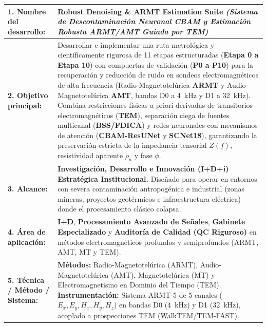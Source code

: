\documentclass[11pt,letterpaper]{article}
\begin{document}
\begin{tcolorbox}[
    colback=white,
    colframe=geotemBlue,
    arc=2mm,
    boxrule=1pt,
    title=\textbf{\large 10 Puntos de Caracterización Institucional},
    coltitle=white,
    colbacktitle=geotemBlue,
    left=10pt, right=10pt, top=10pt, bottom=10pt
]

\renewcommand{\arraystretch}{1.36}
\begin{tabularx}{\textwidth}{@{} p{4.6cm} X @{}}
    \textbf{1. Nombre del desarrollo:} & 
    \textbf{Robust Denoising \& ARMT Estimation Suite} \newline
    \textit{(Sistema de Descontaminación Neuronal CBAM y Estimación Robusta ARMT/AMT Guiada por TEM)} \\
    \hline

    \textbf{2. Objetivo principal:} & 
    Desarrollar e implementar una ruta metrológica y científicamente rigurosa de 11 etapas estructuradas (\textbf{Etapa 0 a Etapa 10}) con compuertas de validación (\textbf{P0 a P10}) para la recuperación y reducción de ruido en sondeos electromagnéticos de alta frecuencia (Radio-Magnetotelúrica \textbf{ARMT} y Audio-Magnetotelúrica \textbf{AMT}, bandas D0 a 4~kHz y D1 a 32~kHz). Combina restricciones físicas a priori derivadas de transitorios electromagnéticos (\textbf{TEM}), separación ciega de fuentes multicanal (\textbf{BSS/FDICA}) y redes neuronales con mecanismos de atención (\textbf{CBAM-ResUNet} y \textbf{SCNet18}), garantizando la preservación estricta de la impedancia tensorial $Z(f)$, resistividad aparente $\rho_a$ y fase $\phi$. \\
    \hline

    \textbf{3. Alcance:} & 
    \textbf{Investigación, Desarrollo e Innovación (I+D+i) Estratégica Institucional.} Diseñado para operar en entornos con severa contaminación antropogénica e industrial (zonas mineras, proyectos geotérmicos e infraestructura eléctrica) donde el procesamiento clásico colapsa. \\
    \hline

    \textbf{4. Área de aplicación:} & 
    \textbf{I+D}, \textbf{Procesamiento Avanzado de Señales}, \textbf{Gabinete Especializado} y \textbf{Auditoría de Calidad (QC Riguroso)} en métodos electromagnéticos profundos y semiprofundos (ARMT, AMT, MT y TEM). \\
    \hline

    \textbf{5. Técnica / Método / Sistema:} & 
    \textbf{Métodos:} Radio-Magnetotelúrica (ARMT), Audio-Magnetotelúrica (AMT), Magnetotelúrica (MT) y Electromagnetismo en Dominio del Tiempo (TEM). \newline
    \textbf{Instrumentación:} Sistema ARMT-5 de 5 canales ($E_x, E_y, H_x, H_y, H_z$) en bandas D0 (4~kHz) y D1 (32~kHz), acoplado a prospecciones TEM (WalkTEM/TEM-FAST). \\
    \hline


\end{tabularx}
\end{tcolorbox}
\end{document}
